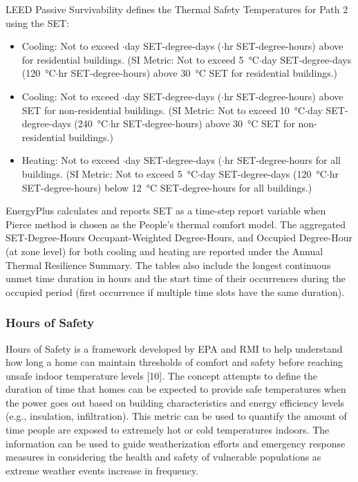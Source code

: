 LEED Passive Survivability defines the Thermal Safety Temperatures for Path 2
using the SET:

\begin{itemize}
\item Cooling: Not to exceed $\cdot$day SET-degree-days ($\cdot$hr SET-degree-hours)
  above  for residential buildings. (SI Metric: Not to exceed
  \SI{5}{\celsius}$\cdot$day SET-degree-days (\SI{120}{\celsius}$\cdot$hr SET-degree-hours) above
  \SI{30}{\celsius} SET for residential buildings.)
\item Cooling: Not to exceed $\cdot$day SET-degree-days ($\cdot$hr SET-degree-hours)
  above  SET for non-residential buildings. (SI Metric: Not to
  exceed \SI{10}{\celsius}$\cdot$day SET-degree-days (\SI{240}{\celsius}$\cdot$hr SET-degree-hours) above
  \SI{30}{\celsius} SET for non-residential buildings.)
\item Heating: Not to exceed $\cdot$day SET-degree-days ($\cdot$hr SET-degree-hours
  for all buildings. (SI Metric: Not to exceed \SI{5}{\celsius}$\cdot$day SET-degree-days
  (\SI{120}{\celsius}$\cdot$hr SET-degree-hours) below \SI{12}{\celsius} SET-degree-hours for all
  buildings.)
\end{itemize}

EnergyPlus calculates and reports SET as a time-step report variable when Pierce
method is chosen as the People's thermal comfort model. The aggregated
SET-Degree-Hours Occupant-Weighted Degree-Hours, and Occupied Degree-Hour (at
zone level) for both cooling and heating are reported under the Annual Thermal
Resilience Summary. The tables also include the longest continuous unmet time
duration in hours and the start time of their occurrences during the occupied
period (first occurrence if multiple time slots have the same duration).

\subsubsection{Hours of Safety}\label{hours-of-safety}

Hours of Safety is a framework developed by EPA and RMI to help understand how
long a home can maintain thresholds of comfort and safety before reaching unsafe
indoor temperature levels [10]. The concept attempts to define the duration of
time that homes can be expected to provide safe temperatures when the power goes
out based on building characteristics and energy efficiency levels (e.g.,
insulation, infiltration). This metric can be used to quantify the amount of
time people are exposed to extremely hot or cold temperatures indoors. The
information can be used to guide weatherization efforts and emergency response
measures in considering the health and safety of vulnerable populations as
extreme weather events increase in frequency.

